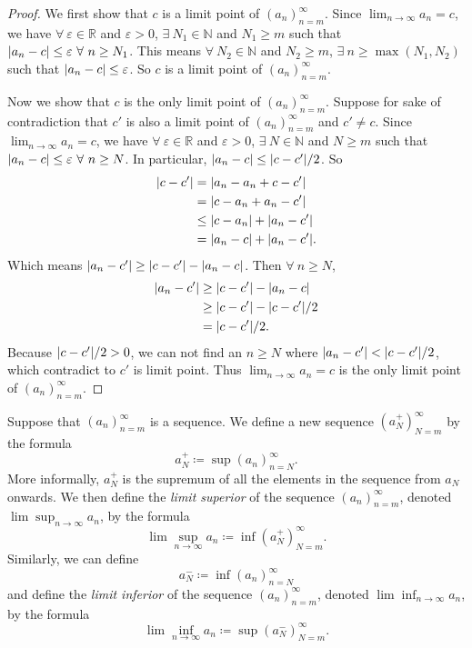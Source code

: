 \begin{proof}
We first show that \(c\) is a limit point of \((a_n)_{n = m}^\infty\).
Since \(\lim_{n \to \infty} a_n = c\), we have \(\forall\ \varepsilon \in \mathds{R}\) and \(\varepsilon > 0\), \(\exists\ N_1 \in \mathds{N}\) and \(N_1 \geq m\) such that \(\abs*{a_n - c} \leq \varepsilon \ \forall\ n \geq N_1\).
This means \(\forall\ N_2 \in \mathds{N}\) and \(N_2 \geq m\), \(\exists\ n \geq \max(N_1, N_2)\) such that \(\abs*{a_n - c} \leq \varepsilon\).
So \(c\) is a limit point of \((a_n)_{n = m}^\infty\).

Now we show that \(c\) is the only limit point of \((a_n)_{n = m}^\infty\).
Suppose for sake of contradiction that \(c'\) is also a limit point of \((a_n)_{n = m}^\infty\) and \(c' \neq c\).
Since \(\lim_{n \to \infty} a_n = c\), we have \(\forall\ \varepsilon \in \mathds{R}\) and \(\varepsilon > 0\), \(\exists\ N \in \mathds{N}\) and \(N \geq m\) such that \(\abs*{a_n - c} \leq \varepsilon \ \forall\ n \geq N\).
In particular, \(\abs*{a_n - c} \leq \abs*{c - c'} / 2\).
So
\begin{align*}
\abs*{c - c'} &= \abs*{a_n - a_n + c - c'} \\
&= \abs*{c - a_n + a_n - c'} \\
&\leq \abs*{c - a_n} + \abs*{a_n - c'} \\
&= \abs*{a_n - c} + \abs*{a_n - c'}.
\end{align*}
Which means \(\abs*{a_n - c'} \geq \abs*{c - c'} - \abs*{a_n - c}\).
Then \(\forall\ n \geq N\),
\begin{align*}
\abs*{a_n - c'} &\geq \abs*{c - c'} - \abs*{a_n - c} \\
&\geq \abs*{c - c'} - \abs*{c - c'} / 2 \\
&= \abs*{c - c'} / 2.
\end{align*}
Because \(\abs*{c - c'} / 2 > 0\), we can not find an \(n \geq N\) where \(\abs*{a_n - c'} < \abs*{c - c'} / 2\), which contradict to \(c'\) is limit point.
Thus \(\lim_{n \to \infty} a_n = c\) is the only limit point of \((a_n)_{n = m}^\infty\).
\end{proof}

\begin{definition}\label{6.4.6}
Suppose that \((a_n)_{n = m}^\infty\) is a sequence.
We define a new sequence \((a_N^+)_{N = m}^\infty\) by the formula
\[
    a_N^+ \coloneqq \sup(a_n)_{n = N}^\infty.
\]
More informally, \(a_N^+\) is the supremum of all the elements in the sequence from \(a_N\) onwards.
We then define the \emph{limit superior} of the sequence \((a_n)_{n = m}^\infty\), denoted \(\lim\sup_{n \to \infty} a_n\), by the formula
\[
    \lim\sup_{n \to \infty} a_n \coloneqq \inf(a_N^+)_{N = m}^\infty.
\]
Similarly, we can define
\[
    a_N^- \coloneqq \inf(a_n)_{n = N}^\infty
\]
and define the \emph{limit inferior} of the sequence \((a_n)_{n = m}^\infty\), denoted \(\lim\inf_{n \to \infty} a_n\), by the formula
\[
    \lim\inf_{n \to \infty} a_n \coloneqq \sup(a_N^-)_{N = m}^\infty.
\]
\end{definition}

